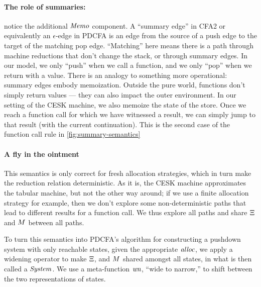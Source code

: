 \paragraph{The role of summaries:} notice the additional $\mathit{Memo}$ component.
%
A ``summary edge'' in CFA2 or equivalently an $\epsilon$-edge in PDCFA is an edge from the source of a push edge to the target of the matching pop edge.
%
``Matching'' here means there is a path through machine reductions that don't change the stack, or through summary edges.
%
In our model, we only ``push'' when we call a function, and we only ``pop'' when we return with a value.
%
There is an analogy to something more operational: summary edges embody memoization.
%
Outside the pure world, functions don't simply return values --- they can also impact the outer environment.
%
In our setting of the CESK machine, we also memoize the state of the store.
%
Once we reach a function call for which we have witnessed a result, we can simply jump to that result (with the current continuation).
%
This is the second case of the function call rule in \autoref{fig:summary-semantics}

\paragraph{A fly in the ointment} This semantics is only correct for fresh allocation strategies, which in turn make the reduction relation deterministic.
%
As it is, the CESK machine approximates the tabular machine, but not the other way around;
%
if we use a finite allocation strategy for example, then we don't explore some non-deterministic paths that lead to different results for a function call.
%
We thus explore all paths and share $\Xi$ and $M$ between all paths.

To turn this semantics into PDCFA's algorithm for constructing a pushdown system with only reachable states, given the appropriate $\mathit{alloc}$, we apply a widening operator to make $\Xi$, and $M$ shared amongst all states, in what is then called a $\mathit{System}$. We use a meta-function $\mathit{wn}$, ``wide to narrow,'' to shift between the two representations of states.

